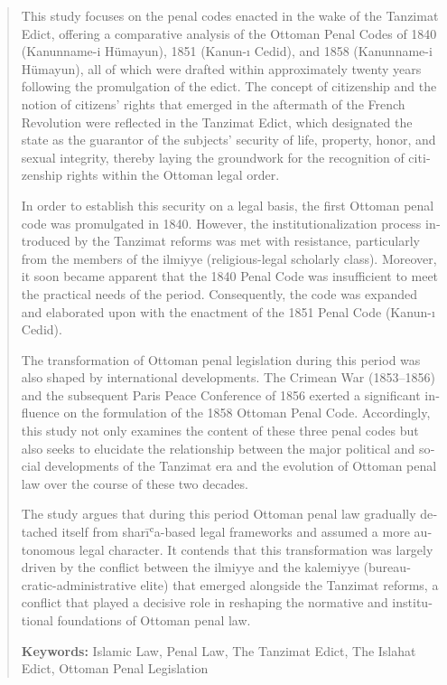 \begin{otherlanguage}{english} 
\begin{abstract}
This study focuses on the penal codes enacted in the wake of the Tanzimat Edict, offering a comparative analysis of the Ottoman Penal Codes of 1840 (Kanunname-i Hümayun), 1851 (Kanun-ı Cedid), and 1858 (Kanunname-i Hümayun), all of which were drafted within approximately twenty years following the promulgation of the edict. The concept of citizenship and the notion of citizens’ rights that emerged in the aftermath of the French Revolution were reflected in the Tanzimat Edict, which designated the state as the guarantor of the subjects’ security of life, property, honor, and sexual integrity, thereby laying the groundwork for the recognition of citizenship rights within the Ottoman legal order.

In order to establish this security on a legal basis, the first Ottoman penal code was promulgated in 1840. However, the institutionalization process introduced by the Tanzimat reforms was met with resistance, particularly from the members of the ilmiyye (religious-legal scholarly class). Moreover, it soon became apparent that the 1840 Penal Code was insufficient to meet the practical needs of the period. Consequently, the code was expanded and elaborated upon with the enactment of the 1851 Penal Code (Kanun-ı Cedid).

The transformation of Ottoman penal legislation during this period was also shaped by international developments. The Crimean War (1853–1856) and the subsequent Paris Peace Conference of 1856 exerted a significant influence on the formulation of the 1858 Ottoman Penal Code. Accordingly, this study not only examines the content of these three penal codes but also seeks to elucidate the relationship between the major political and social developments of the Tanzimat era and the evolution of Ottoman penal law over the course of these two decades.

The study argues that during this period Ottoman penal law gradually detached itself from sharīʿa-based legal frameworks and assumed a more autonomous legal character. It contends that this transformation was largely driven by the conflict between the ilmiyye and the kalemiyye (bureaucratic-administrative elite) that emerged alongside the Tanzimat reforms, a conflict that played a decisive role in reshaping the normative and institutional foundations of Ottoman penal law.

\textbf{Keywords:} Islamic Law, Penal Law, The Tanzimat Edict, The Islahat Edict, Ottoman Penal Legislation
\end{abstract}
\end{otherlanguage}
\clearpage